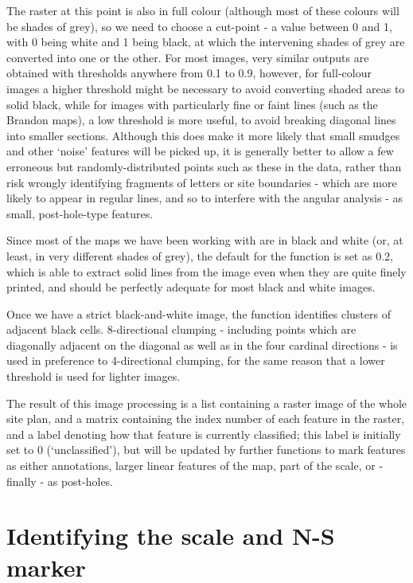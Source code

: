 \documentclass[10pt,fleqn]{article}
\begin{document}
The raster at this point is also in full colour (although most of these colours will be shades of grey), so we need to choose a cut-point - a value between 0 and 1, with 0 being white and 1 being black, at which the intervening shades of grey are converted into one or the other. For most images, very similar outputs are obtained with thresholds anywhere from 0.1 to 0.9, however, for full-colour images a higher threshold might be necessary to avoid converting shaded areas to solid black, while for images with particularly fine or faint lines (such as the Brandon maps), a low threshold is more useful, to avoid breaking diagonal lines into smaller sections. Although this does make it more likely that small smudges and other `noise' features will be picked up, it is generally better to allow a few erroneous but randomly-distributed points such as these in the data, rather than risk wrongly identifying fragments of letters or site boundaries - which are more likely to appear in regular lines, and so to interfere with the angular analysis - as small, post-hole-type features.

Since most of the maps we have been working with are in black and white (or, at least, in very different shades of grey), the default for the function is set as 0.2, which is able to extract solid lines from the image even when they are quite finely printed, and should be perfectly adequate for most black and white images.

Once we have a strict black-and-white image, the function identifies clusters of adjacent black cells. 8-directional clumping -  including points which are diagonally adjacent on the diagonal as well as in the four cardinal directions - is used in preference to 4-directional clumping, for the same reason that a lower threshold is used for lighter images.

The result of this image processing is a list containing a raster image of the whole site plan, and a matrix containing the index number of each feature in the raster, and a label denoting how that feature is currently classified; this label is initially set to 0 (`unclassified'), but will be updated by further functions to mark features as either annotations, larger linear features of the map, part of the scale, or - finally - as post-holes.%


\section{Identifying the scale and N-S marker}
\end{document}
